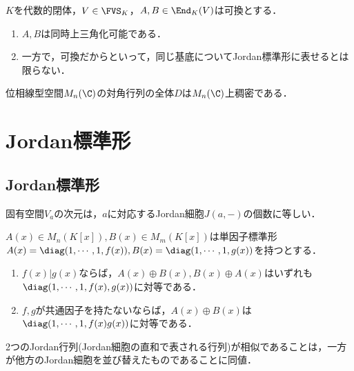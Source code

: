 \documentclass[uplatex, dvipdfmx]{jsreport}
\begin{document}
\begin{proposition}[同時Jordan行列化は必ずしも可能でない]
    $K$を代数的閉体，$V\in\FVS_K$，$A,B\in\End_K(V)$は可換とする．
    \begin{enumerate}
        \item $A,B$は同時上三角化可能である．
        \item 一方で，可換だからといって，同じ基底についてJordan標準形に表せるとは限らない．
    \end{enumerate}
\end{proposition}

\begin{proposition}
    位相線型空間$M_n(\C)$の対角行列の全体$D$は$M_n(\C)$上稠密である．
\end{proposition}

\section{Jordan標準形}

\subsection{Jordan標準形}

\begin{tcolorbox}[colframe=ForestGreen, colback=ForestGreen!10!white,breakable,colbacktitle=ForestGreen!40!white,coltitle=black,fonttitle=\bfseries\sffamily,
title=]
    固有空間$V_a$の次元は，$a$に対応するJordan細胞$J(a,-)$の個数に等しい．
\end{tcolorbox}

\begin{lemma}[$x$-行列の直和の標準形]
    $A(x)\in M_n(K[x]),B(x)\in M_m(K[x])$は単因子標準形$A(x)=\diag(1,\cdots,1,f(x)),B(x)=\diag(1,\cdots,1,g(x))$を持つとする．
    \begin{enumerate}
        \item $f(x)|g(x)$ならば，$A(x)\oplus B(x),B(x)\oplus A(x)$はいずれも$\diag(1,\cdots,1,f(x),g(x))$に対等である．
        \item $f,g$が共通因子を持たないならば，$A(x)\oplus B(x)$は$\diag(1,\cdots,1,f(x)g(x))$に対等である．
    \end{enumerate}
\end{lemma}

\begin{corollary}[Jordan標準形の共役類]
    2つのJordan行列(Jordan細胞の直和で表される行列)が相似であることは，一方が他方のJordan細胞を並び替えたものであることに同値．
\end{corollary}
\end{document}
